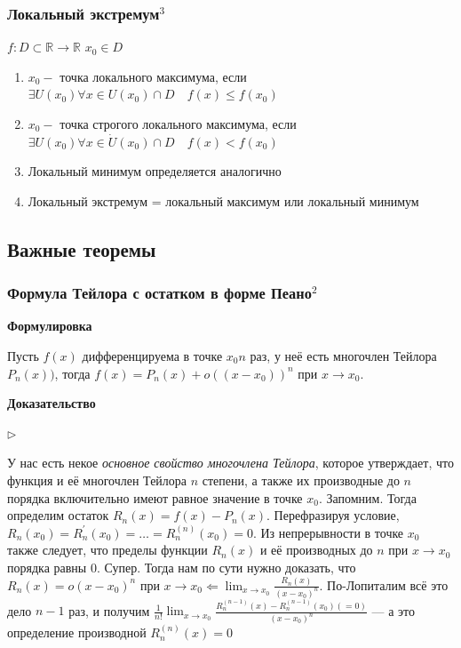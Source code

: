 \documentclass{article}
\begin{document}
\subsubsection{Локальный экстремум\texorpdfstring{$^3$}{}}
$f:D\subset \mathbb{R} \to \mathbb{R}$ $x_0 \in D$
\begin{enumerate}
\item $x_0 - $ точка локального максимума, если $\exists U(x_0) \forall x \in U(x_0) \cap D\quad f(x) \leq f(x_0)$
\item $x_0 - $ точка строгого локального максимума, если $\exists U(x_0) \forall x \in \dot U(x_0) \cap D\quad f(x) < f(x_0)$
\item Локальный минимум определяется аналогично
\item Локальный экстремум = локальный максимум или локальный минимум
\end{enumerate}

\newpage
\subsection{Важные теоремы}

\subsubsection{Формула Тейлора с остатком в форме Пеано\texorpdfstring{$^2$}{}}

\textbf{Формулировка}

Пусть $f(x)$ дифференцируема в точке $x_0 n$ раз, у неё есть многочлен Тейлора $P_n(x))$, тогда $f(x) = P_n(x) + o((x - x_0))^n$ при $x \rightarrow x_0$.

\textbf{Доказательство}

$\rhd$

У нас есть некое \textit{основное свойство многочлена Тейлора}, которое утверждает, что функция и её многочлен Тейлора $n$ степени, а также их производные до $n$ порядка включительно имеют равное значение в точке $x_0$. Запомним. Тогда определим остаток $R_n(x) = f(x) - P_n(x)$. Перефразируя условие, $R_n(x_0) = R_n^\prime(x_0) = \ldots = R_n^{(n)}(x_0) = 0$. Из непрерывности в точке $x_0$ также следует, что пределы функции $R_n(x)$ и её производных до $n$ при $x \rightarrow x_0$ порядка равны 0. Супер. Тогда нам по сути нужно доказать, что $R_n(x) = o(x - x_0)^n$ при $x \rightarrow x_0 \Leftarrow \lim_{x \rightarrow x_0}\frac{R_n(x)}{(x - x_0)^n}$. По-Лопиталим всё это дело $n - 1$ раз, и получим $\frac{1}{n!}\lim_{x \rightarrow x_0}\frac{R_n^{(n - 1)}(x) - R_n^{(n - 1)}(x_0) (= 0)}{(x - x_0)^n}$ --- а это определение производной $R_n^{(n)}(x) = 0$
\end{document}
